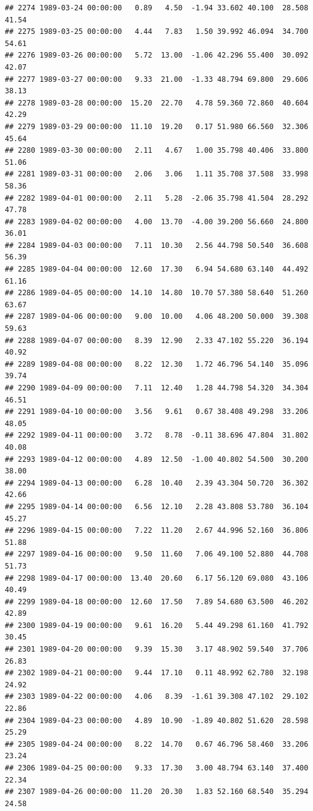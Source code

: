 \documentclass{article}\usepackage{graphicx, color}
\makeatletter
\newenvironment{kframe}{%
 \def\at@end@of@kframe{}%
 \ifinner\ifhmode%
  \def\at@end@of@kframe{\end{minipage}}%
  \begin{minipage}{\columnwidth}%
 \fi\fi%
 \def\FrameCommand##1{\hskip\@totalleftmargin \hskip-\fboxsep
 \colorbox{shadecolor}{##1}\hskip-\fboxsep
     \hskip-\linewidth \hskip-\@totalleftmargin \hskip\columnwidth}%
 \MakeFramed {\advance\hsize-\width
   \@totalleftmargin\z@ \linewidth\hsize
   \@setminipage}}%
 {\par\unskip\endMakeFramed%
 \at@end@of@kframe}
\newenvironment{knitrout}{}{} %
\makeatother
\begin{document}
\begin{knitrout}
\begin{kframe}
\begin{verbatim}
## 2274 1989-03-24 00:00:00   0.89   4.50  -1.94 33.602 40.100  28.508  41.54
## 2275 1989-03-25 00:00:00   4.44   7.83   1.50 39.992 46.094  34.700  54.61
## 2276 1989-03-26 00:00:00   5.72  13.00  -1.06 42.296 55.400  30.092  42.07
## 2277 1989-03-27 00:00:00   9.33  21.00  -1.33 48.794 69.800  29.606  38.13
## 2278 1989-03-28 00:00:00  15.20  22.70   4.78 59.360 72.860  40.604  42.29
## 2279 1989-03-29 00:00:00  11.10  19.20   0.17 51.980 66.560  32.306  45.64
## 2280 1989-03-30 00:00:00   2.11   4.67   1.00 35.798 40.406  33.800  51.06
## 2281 1989-03-31 00:00:00   2.06   3.06   1.11 35.708 37.508  33.998  58.36
## 2282 1989-04-01 00:00:00   2.11   5.28  -2.06 35.798 41.504  28.292  47.78
## 2283 1989-04-02 00:00:00   4.00  13.70  -4.00 39.200 56.660  24.800  36.01
## 2284 1989-04-03 00:00:00   7.11  10.30   2.56 44.798 50.540  36.608  56.39
## 2285 1989-04-04 00:00:00  12.60  17.30   6.94 54.680 63.140  44.492  61.16
## 2286 1989-04-05 00:00:00  14.10  14.80  10.70 57.380 58.640  51.260  63.67
## 2287 1989-04-06 00:00:00   9.00  10.00   4.06 48.200 50.000  39.308  59.63
## 2288 1989-04-07 00:00:00   8.39  12.90   2.33 47.102 55.220  36.194  40.92
## 2289 1989-04-08 00:00:00   8.22  12.30   1.72 46.796 54.140  35.096  39.74
## 2290 1989-04-09 00:00:00   7.11  12.40   1.28 44.798 54.320  34.304  46.51
## 2291 1989-04-10 00:00:00   3.56   9.61   0.67 38.408 49.298  33.206  48.05
## 2292 1989-04-11 00:00:00   3.72   8.78  -0.11 38.696 47.804  31.802  40.08
## 2293 1989-04-12 00:00:00   4.89  12.50  -1.00 40.802 54.500  30.200  38.00
## 2294 1989-04-13 00:00:00   6.28  10.40   2.39 43.304 50.720  36.302  42.66
## 2295 1989-04-14 00:00:00   6.56  12.10   2.28 43.808 53.780  36.104  45.27
## 2296 1989-04-15 00:00:00   7.22  11.20   2.67 44.996 52.160  36.806  51.88
## 2297 1989-04-16 00:00:00   9.50  11.60   7.06 49.100 52.880  44.708  51.73
## 2298 1989-04-17 00:00:00  13.40  20.60   6.17 56.120 69.080  43.106  40.49
## 2299 1989-04-18 00:00:00  12.60  17.50   7.89 54.680 63.500  46.202  42.89
## 2300 1989-04-19 00:00:00   9.61  16.20   5.44 49.298 61.160  41.792  30.45
## 2301 1989-04-20 00:00:00   9.39  15.30   3.17 48.902 59.540  37.706  26.83
## 2302 1989-04-21 00:00:00   9.44  17.10   0.11 48.992 62.780  32.198  24.92
## 2303 1989-04-22 00:00:00   4.06   8.39  -1.61 39.308 47.102  29.102  22.86
## 2304 1989-04-23 00:00:00   4.89  10.90  -1.89 40.802 51.620  28.598  25.29
## 2305 1989-04-24 00:00:00   8.22  14.70   0.67 46.796 58.460  33.206  23.24
## 2306 1989-04-25 00:00:00   9.33  17.30   3.00 48.794 63.140  37.400  22.34
## 2307 1989-04-26 00:00:00  11.20  20.30   1.83 52.160 68.540  35.294  24.58

\end{verbatim}
\end{kframe}
\end{knitrout}
\end{document}
